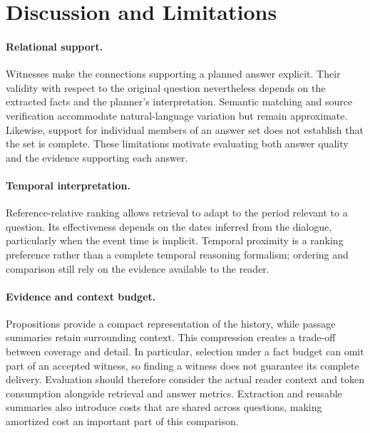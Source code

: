 \section{Discussion and Limitations}
\label{sec:discussion}

\paragraph{Relational support.}
Witnesses make the connections supporting a planned answer explicit.
Their validity with respect to the original question nevertheless
depends on the extracted facts and the planner's interpretation.
Semantic matching and source verification accommodate natural-language
variation but remain approximate. Likewise, support for individual
members of an answer set does not establish that the set is complete.
These limitations motivate evaluating both answer quality and the
evidence supporting each answer.

\paragraph{Temporal interpretation.}
Reference-relative ranking allows retrieval to adapt to the period
relevant to a question. Its effectiveness depends on the dates inferred
from the dialogue, particularly when the event time is implicit.
Temporal proximity is a ranking preference rather than a complete
temporal reasoning formalism; ordering and comparison still rely on
the evidence available to the reader.

\paragraph{Evidence and context budget.}
Propositions provide a compact representation of the history, while
passage summaries retain surrounding context. This compression creates
a trade-off between coverage and detail. In particular, selection under
a fact budget can omit part of an accepted witness, so finding a witness
does not guarantee its complete delivery. Evaluation should therefore
consider the actual reader context and token consumption alongside
retrieval and answer metrics. Extraction and reusable summaries also
introduce costs that are shared across questions, making amortized cost
an important part of this comparison.
